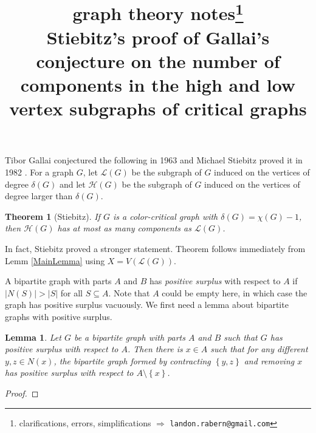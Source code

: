 \documentclass[12pt]{article}
\title{graph theory notes\thanks{clarifications, errors, simplifications $\Rightarrow$ \texttt{landon.rabern@gmail.com}}\\ \bigskip
Stiebitz's proof of Gallai's conjecture on the number of components in the high and low vertex subgraphs of critical graphs}
\date{}
\theoremstyle{plain}
\newtheorem{lem}[thm]{Lemma}
\newtheorem*{Theorem}{Theorem}
\theoremstyle{definition}
\theoremstyle{remark}
\newcommand{\fancy}[1]{\mathcal{#1}}
\renewcommand{\L}{\fancy{L}}
\newcommand{\set}[1]{\left\{ #1 \right\}}
\def\L{\fancy{L}}
\def\H{\fancy{H}}
\begin{document}
\maketitle

Tibor Gallai conjectured the following in 1963 \cite{gallai1963kritische, gallai1963kritische2} and Michael Stiebitz proved it in 1982 \cite{stiebitz1982proof}.  For a graph $G$,
let $\L(G)$ be the subgraph of $G$ induced on the vertices of degree $\delta(G)$ and let $\H(G)$ be the subgraph of $G$ induced on the vertices of degree larger than $\delta(G)$.

\begin{Theorem}[Stiebitz]
If $G$ is a color-critical graph with $\delta(G) = \chi(G) - 1$, then $\H(G)$ has at most as many components as $\L(G)$.
\end{Theorem}

In fact, Stiebitz proved a stronger statement.  Theorem follows immediately from Lemm \ref{MainLemma} using $X = V(\L(G))$.  


A bipartite graph with parts $A$ and $B$ has \emph{positive surplus} with respect to $A$ if $|N(S)| > |S|$ for all $S \subseteq A$.  Note that $A$ could be empty here, in which case the graph has positive surplus vacuously.  We first need a lemma about bipartite graphs with positive surplus.

\begin{lem}\label{BipartiteLemma}
Let $G$ be a bipartite graph with parts $A$ and $B$ such that $G$ has positive surplus with respect to $A$.  Then there is $x \in A$ such that for any different $y,z \in N(x)$, the bipartite graph formed by contracting $\set{y,z}$ and removing $x$ has positive surplus with respect to $A \setminus \set{x}$.
\end{lem}
\begin{proof}

\end{proof}
\end{document}

